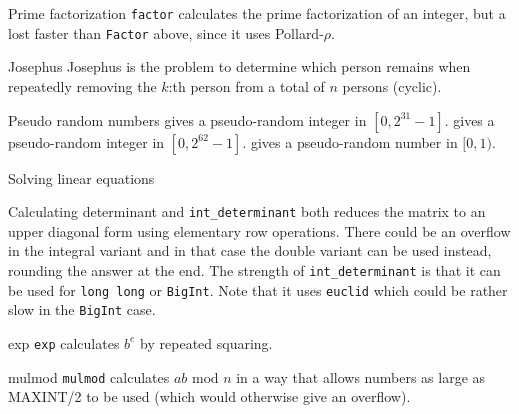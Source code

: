 \begin{algorithm}{Prime factorization}
\desc
{\tt factor} calculates the prime factorization of an integer, but a
lost faster than {\tt Factor} above, since it uses Pollard-$\rho$.
\end{algorithm}

\begin{algorithm}{Josephus}
\desc
Josephus is the problem to determine which person remains when repeatedly
removing the $k$:th person from a total of $n$ persons (cyclic).
\end{algorithm}


\begin{algorithm}{Pseudo random numbers}
 gives a pseudo-random integer in
$[0,2^{31}-1]$.
 gives a pseudo-random integer in
$[0,2^{62}-1]$.
 gives a pseudo-random number in
$[0,1)$.
\end{algorithm}

\begin{algorithm}{Solving linear equations}
\end{algorithm}

\begin{algorithm}{Calculating determinant}
 and {\tt int\_determinant} both reduces the matrix
to an upper diagonal form using elementary row operations. There could be an
overflow in the integral variant and in that case the double variant
can be used instead, rounding the answer at the end. The strength of
{\tt int\_determinant} is that it can be used for {\tt long long} or
{\tt BigInt}. Note that it uses {\tt euclid} which could be rather
slow in the {\tt BigInt} case.
\end{algorithm}

\begin{algorithm}{exp}
\desc
{\tt exp} calculates $b^e$ by repeated squaring.
\end{algorithm}

\begin{algorithm}{mulmod}
\desc
{\tt mulmod} calculates $ab\mbox{ mod } n$ in a way that
allows numbers as large as MAXINT/2 to be used (which would otherwise give
an overflow).
\end{algorithm}

